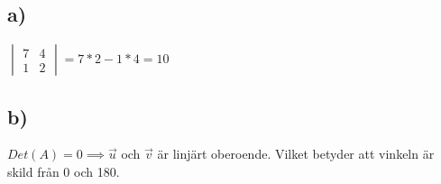 \subsection*{a)}
				$ 
    			\begin{vmatrix}
   		 		7  & 4 \\
  		  		1  & 2
		    	\end{vmatrix}
		    	=
		    	7*2 - 1*4
		    	= 10
  			  	$
\subsection*{b)}
$Det(A) = 0 \implies \vec{u}$ och $\vec{v}$ är linjärt oberoende. Vilket betyder att vinkeln är skild från 0 och 180.